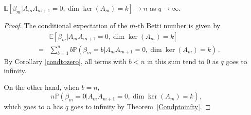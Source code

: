 \begin{corollary}
$\mathbb{E}[\beta_m | A_{m}A_{m+1} = 0, \dim\ker(A_{m}) = k ] \to n$ as $q\to\infty$.
\begin{proof}
The conditional expectation of the $m$-th Betti number is given by
	\begin{eqnarray*}
	& & \mathbb{E}[\beta_m | A_{m}A_{m+1} = 0, \dim\ker(A_{m}) = k ]\\
	&=& \sum_{b=1}^n b \mathbb{P}(\beta_m = b | A_{m}A_{m+1} = 0, \dim\ker(A_{m}) = k ) \, .
	\end{eqnarray*}
By Corollary \ref{condtozero}, all terms with $b< n$ in this sum tend to 
$0$ as $q$ goes to infinity. 

On the other hand, when $b=n$, 
\[
n\mathbb{P}(\beta_m=0| A_{m}A_{m+1} = 0, \dim\ker(A_{m}) = k ),
\]
which goes to $n$ has $q$ goes to infinity by Theorem~\ref{Condptoinfty}.
\end{proof}
\end{corollary}

